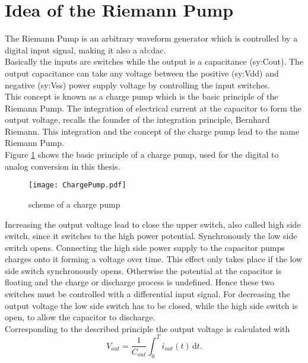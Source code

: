 \section{Idea of the Riemann Pump}
\label{IdeaRiemannPump}
The Riemann Pump is an arbitrary waveform generator which is controlled by a digital input signal, making it also a \gls{ab:dac}.\\
Basically the inputs are switches while the output is a capacitance (\gls{sy:Cout}).
The output capacitance can take any voltage between the positive (\gls{sy:Vdd}) and negative (\gls{sy:Vss}) power supply voltage by controlling the input switches.\\
This concept is known as a charge pump which is the basic principle of the Riemann Pump.
The integration of electrical current at the capacitor to form the output voltage, recalls the founder of the integration principle, Bernhard Riemann.
This integration and the concept of the charge pump lead to the name Riemann Pump.\\
Figure \ref{fig:ChargePump} shows the basic principle of a charge pump, used for the digital to analog conversion in this thesis.

\begin{figure}[ht]
	\centering
  \texttt{[image: ChargePump.pdf]}
	\caption{scheme of a charge pump}
	\label{fig:ChargePump}
\end{figure}

Increasing the output voltage lead to close the upper switch, also called high side switch, since it switches to the high power potential.
Synchronously the low side switch opens.
Connecting the high side power supply to the capacitor pumps charges onto it forming a voltage over time.
This effect only takes place if the low side switch synchronously opens.
Otherwise the potential at the capacitor is floating and the charge or discharge process is undefined.
Hence these two switches must be controlled with a differential input signal.
For decreasing the output voltage the low side switch has to be closed, while the high side switch is open, to allow the capacitor to discharge.\\
Corresponding to the described principle the output voltage is calculated with 
\begin{equation}
	V_{out} = \frac{1}{C_{out}}{ \int_0^T \! i_{out}(t) \, \mathrm{d}t}.
\end{equation} %

